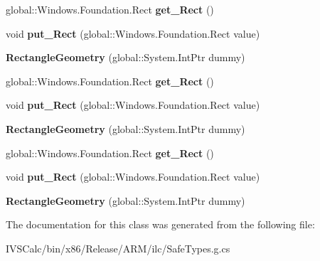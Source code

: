 \begin{DoxyCompactItemize}
global\+::\+Windows.\+Foundation.\+Rect {\bfseries get\+\_\+\+Rect} ()
\item 
\mbox{\label{class_windows_1_1_u_i_1_1_xaml_1_1_media_1_1_rectangle_geometry_a3e2065d107f3dc6e157df89da8d4b663}} 
void {\bfseries put\+\_\+\+Rect} (global\+::\+Windows.\+Foundation.\+Rect value)
\item 
\mbox{\label{class_windows_1_1_u_i_1_1_xaml_1_1_media_1_1_rectangle_geometry_a43a7d5449868ae9aee5afae7b94fde9d}} 
{\bfseries Rectangle\+Geometry} (global\+::\+System.\+Int\+Ptr dummy)
\item 
\mbox{\label{class_windows_1_1_u_i_1_1_xaml_1_1_media_1_1_rectangle_geometry_a3864ff059431d3b56d46d00294edd3c5}} 
global\+::\+Windows.\+Foundation.\+Rect {\bfseries get\+\_\+\+Rect} ()
\item 
\mbox{\label{class_windows_1_1_u_i_1_1_xaml_1_1_media_1_1_rectangle_geometry_a3e2065d107f3dc6e157df89da8d4b663}} 
void {\bfseries put\+\_\+\+Rect} (global\+::\+Windows.\+Foundation.\+Rect value)
\item 
\mbox{\label{class_windows_1_1_u_i_1_1_xaml_1_1_media_1_1_rectangle_geometry_a43a7d5449868ae9aee5afae7b94fde9d}} 
{\bfseries Rectangle\+Geometry} (global\+::\+System.\+Int\+Ptr dummy)
\item 
\mbox{\label{class_windows_1_1_u_i_1_1_xaml_1_1_media_1_1_rectangle_geometry_a3864ff059431d3b56d46d00294edd3c5}} 
global\+::\+Windows.\+Foundation.\+Rect {\bfseries get\+\_\+\+Rect} ()
\item 
\mbox{\label{class_windows_1_1_u_i_1_1_xaml_1_1_media_1_1_rectangle_geometry_a3e2065d107f3dc6e157df89da8d4b663}} 
void {\bfseries put\+\_\+\+Rect} (global\+::\+Windows.\+Foundation.\+Rect value)
\item 
\mbox{\label{class_windows_1_1_u_i_1_1_xaml_1_1_media_1_1_rectangle_geometry_a43a7d5449868ae9aee5afae7b94fde9d}} 
{\bfseries Rectangle\+Geometry} (global\+::\+System.\+Int\+Ptr dummy)
\end{DoxyCompactItemize}


The documentation for this class was generated from the following file\+:\begin{DoxyCompactItemize}
\item 
I\+V\+S\+Calc/bin/x86/\+Release/\+A\+R\+M/ilc/Safe\+Types.\+g.\+cs\end{DoxyCompactItemize}
